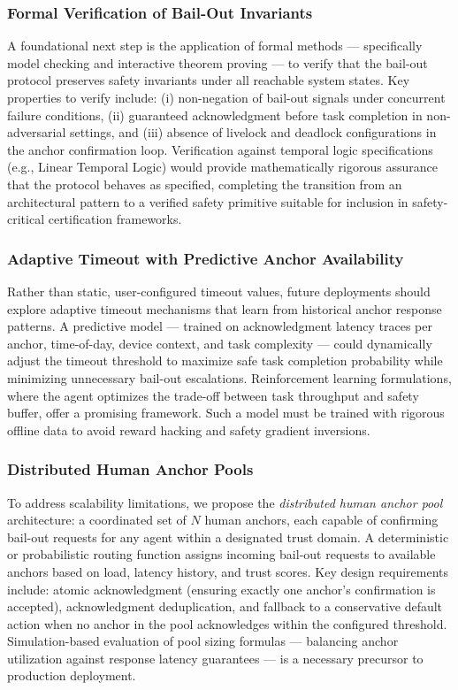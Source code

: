 \subsubsection{Formal Verification of Bail-Out Invariants}
\label{sec:future:verification}
A foundational next step is the application of formal methods — specifically
model checking and interactive theorem proving — to verify that the bail-out
protocol preserves safety invariants under all reachable system states. Key
properties to verify include: (i) non-negation of bail-out signals under
concurrent failure conditions, (ii) guaranteed acknowledgment before task
completion in non-adversarial settings, and (iii) absence of livelock and
deadlock configurations in the anchor confirmation loop. Verification against
temporal logic specifications (e.g., Linear Temporal Logic) would provide
mathematically rigorous assurance that the protocol behaves as specified,
completing the transition from an architectural pattern to a
verified safety primitive suitable for inclusion in safety-critical certification
frameworks.

\subsubsection{Adaptive Timeout with Predictive Anchor Availability}
\label{sec:future:adaptive}
Rather than static, user-configured timeout values, future deployments should
explore adaptive timeout mechanisms that learn from historical anchor response
patterns. A predictive model — trained on acknowledgment latency traces per
anchor, time-of-day, device context, and task complexity — could dynamically
adjust the timeout threshold to maximize safe task completion probability
while minimizing unnecessary bail-out escalations. Reinforcement learning
formulations, where the agent optimizes the trade-off between task throughput
and safety buffer, offer a promising framework. Such a model must be trained
with rigorous offline data to avoid reward hacking and safety gradient inversions.

\subsubsection{Distributed Human Anchor Pools}
\label{sec:future:distributed}
To address scalability limitations, we propose the \textit{distributed human
anchor pool} architecture: a coordinated set of $N$ human anchors, each capable
of confirming bail-out requests for any agent within a designated trust domain.
A deterministic or probabilistic routing function assigns incoming bail-out
requests to available anchors based on load, latency history, and trust scores.
Key design requirements include: atomic acknowledgment (ensuring exactly one
anchor's confirmation is accepted), acknowledgment deduplication, and fallback
to a conservative default action when no anchor in the pool acknowledges within
the configured threshold. Simulation-based evaluation of pool sizing formulas
— balancing anchor utilization against response latency guarantees — is a
necessary precursor to production deployment.

